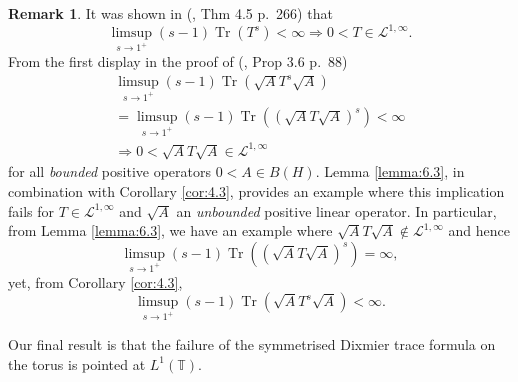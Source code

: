 \documentclass[final,1p]{elsarticle}
\numberwithin{equation}{section}
\theoremstyle{plain}
\theoremstyle{definition}
\newtheorem{rems}[thm]{Remark}
\begin{document}
\begin{rems}
It was shown in (\cite{CRSS}, Thm 4.5 p.~266) that
$$
\limsup_{s \to 1^+} (s-1)\operatorname{Tr}(T^{s}) < \infty \Rightarrow 0 < T \in \mathcal{L}^{1,\infty}.
$$
From the first display in the proof of (\cite{CPS}, Prop 3.6 p.~88)
\begin{multline*}
\limsup_{s \to 1^+} (s-1)\operatorname{Tr}(\sqrt{A}T^{s}\sqrt{A}) \\
=  \limsup_{s \to 1^+} (s-1)\operatorname{Tr}((\sqrt{A}T\sqrt{A})^s) < \infty \\
 \Rightarrow 0 < \sqrt{A}T\sqrt{A} \in \mathcal{L}^{1,\infty}
\end{multline*}
for all \emph{bounded} positive operators $0 < A \in B(H)$.
Lemma \ref{lemma:6.3}, in combination with Corollary \ref{cor:4.3}, provides an example where this implication fails for $T \in \mathcal{L}^{1,\infty}$ and $\sqrt{A}$ an \emph{unbounded} positive linear operator.  In particular, from Lemma \ref{lemma:6.3}, we have an example where
$\sqrt{A}T\sqrt{A} \not\in \mathcal{L}^{1,\infty}$ and hence 
$$
\limsup_{s \to 1^+} (s-1)\operatorname{Tr}((\sqrt{A}T\sqrt{A})^{s}) = \infty ,
$$
yet, from Corollary \ref{cor:4.3},
$$
\limsup_{s \to 1^+} (s-1)\operatorname{Tr}(\sqrt{A}T^s\sqrt{A}) < \infty .
$$
\end{rems}

Our final result is that the failure of the symmetrised Dixmier trace formula on the torus is pointed at $L^1({\ensuremath{\mathbb{T}}})$.  
\end{document}
